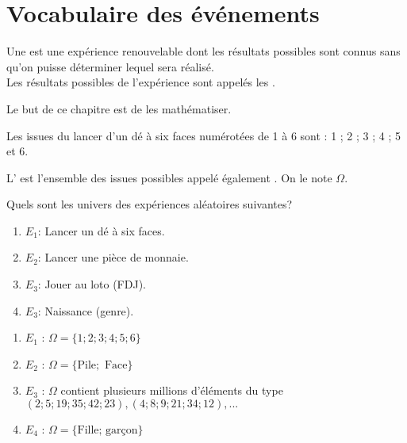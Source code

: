 \section{Vocabulaire des événements}

\begin{definition}
    Une  est une expérience renouvelable dont les résultats possibles sont connus sans qu'on puisse déterminer lequel sera réalisé.\\
    Les résultats possibles de l'expérience sont appelés les .
\end{definition}

\begin{remarque}
 Le but de ce chapitre est de les mathématiser. 
\end{remarque}

\begin{exemple*1}
Les issues du lancer d'un dé à six faces numérotées de 1 à 6 sont : 1 ; 2 ; 3 ; 4 ; 5 et 6.
\end{exemple*1}

\begin{definition}[Univers] L' est l'ensemble
des issues possibles appelé également .
On le note $\Omega$.
\end{definition}


\begin{exemple}
Quels sont les univers des expériences aléatoires suivantes? 
\begin{enumerate}
        \item $E_1$: Lancer un dé à six faces.
        \item $E_2$: Lancer une pièce de monnaie.
        \item $E_3$: Jouer au loto (FDJ).
        \item $E_3$: Naissance (genre).
    \end{enumerate}
\correction 

\begin{enumerate}
        \item $E_1$ : $\Omega=\{1;2;3;4;5;6\}$
        \item $E_2$ : $\Omega = \{\text{Pile}; \text{ Face}%
\}$
        \item $E_3$ : $\Omega$ contient plusieurs millions d'éléments du type
${(2;5;19;35;42;23),(4;8;9;21;34;12),...}$
        \item $E_4$ : $\Omega=\{\text{Fille; garçon}\}$
    \end{enumerate}
\end{exemple}

